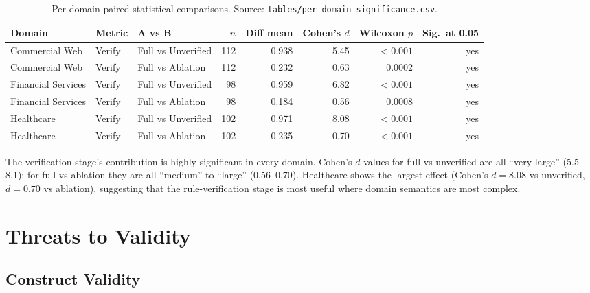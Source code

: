 \documentclass[10pt,twocolumn,letterpaper]{article}
\begin{document}
\begin{table}[t]
\centering
\caption{Per-domain paired statistical comparisons.
Source: \texttt{tables/per\_domain\_significance.csv}.}
\label{tab:per_domain_sig}
\small
\begin{tabular}{lllrrrrr}
\toprule
Domain & Metric & A vs B & $n$ & Diff mean & Cohen's $d$ & Wilcoxon $p$ & Sig.\ at 0.05 \\
\midrule
Commercial Web      & Verify   & Full vs Unverified & 112 & 0.938 & 5.45 & $<0.001$ & yes \\
Commercial Web      & Verify   & Full vs Ablation   & 112 & 0.232 & 0.63 & 0.0002 & yes \\
Financial Services  & Verify   & Full vs Unverified &  98 & 0.959 & 6.82 & $<0.001$ & yes \\
Financial Services  & Verify   & Full vs Ablation   &  98 & 0.184 & 0.56 & 0.0008 & yes \\
Healthcare          & Verify   & Full vs Unverified & 102 & 0.971 & 8.08 & $<0.001$ & yes \\
Healthcare          & Verify   & Full vs Ablation   & 102 & 0.235 & 0.70 & $<0.001$ & yes \\
\bottomrule
\end{tabular}
\end{table}

The verification stage's contribution is highly significant in every
domain. Cohen's $d$ values for full vs unverified are all
``very large'' (5.5--8.1); for full vs ablation they are all
``medium'' to ``large'' (0.56--0.70). Healthcare shows the largest
effect (Cohen's $d = 8.08$ vs unverified, $d = 0.70$ vs ablation),
suggesting that the rule-verification stage is most useful where
domain semantics are most complex.

\section{Threats to Validity}
\label{sec:threats}

\subsection{Construct Validity}
\end{document}
